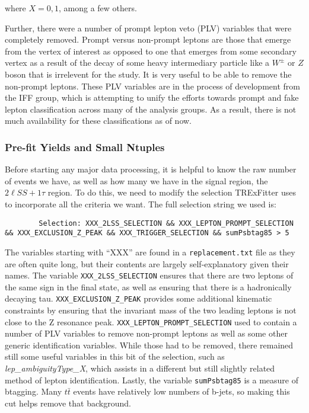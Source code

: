     where $X=0,1$, among a few others. 

    Further, there were a number of prompt lepton veto (PLV) variables that were completely removed. Prompt versus non-prompt leptons are those that emerge from the vertex of interest as opposed to one that emerges from some secondary vertex as a result of the decay of some heavy intermediary particle like a $W^{\pm}$ or $Z$ boson that is irrelevent for the study. It is very useful to be able to remove the non-prompt leptons. These PLV variables are in the process of development from the IFF group, which is attempting to unify the efforts towards prompt and fake lepton classification across many of the analysis groups. As a result, there is not much availability for these classifications as of now.

\subsubsection{Pre-fit Yields and Small Ntuples}
    Before starting any major data processing, it is helpful to know the raw number of events we have, as well as how many we have in the signal region, the $2\ell SS + 1\tau$ region. To do this, we need to modify the selection TRExFitter uses to incorporate all the criteria we want. The full selection string we used is:

    \begin{verbatim}
        Selection: XXX_2LSS_SELECTION && XXX_LEPTON_PROMPT_SELECTION && XXX_EXCLUSION_Z_PEAK && XXX_TRIGGER_SELECTION && sumPsbtag85 > 5
    \end{verbatim}

    The variables starting with ``XXX'' are found in a \texttt{replacement.txt} file as they are often quite long, but their contents are largely self-explanatory given their names. The variable \texttt{XXX_2LSS_SELECTION} ensures that there are two leptons of the same sign in the final state, as well as ensuring that there is a hadronically decaying tau.  \texttt{XXX_EXCLUSION_Z_PEAK} provides some additional kinematic constraints by ensuring that the invariant mass of the two leading leptons is not close to the Z resonance peak. \texttt{XXX_LEPTON_PROMPT_SELECTION} used to contain a number of PLV variables to remove non-prompt leptons as well as some other generic identification variables. While those had to be removed, there remained still some useful variables in this bit of the selection, such as \textit{lep\_ambiguityType\_X}, which assists in a different but still slightly related method of lepton identification.  Lastly, the variable \texttt{sumPsbtag85} is a measure of btagging. Many $t\bar{t}$ events have relatively low numbers of b-jets, so making this cut helps remove that background. 
    
